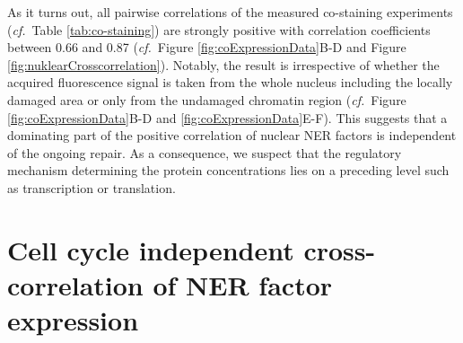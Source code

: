 \noindent As it turns out, all pairwise correlations of the measured co-staining experiments (\textit{cf.}\ Table \ref{tab:co-staining}) are strongly positive with correlation coefficients between 0.66 and 0.87 (\textit{cf.}\ Figure \ref{fig:coExpressionData}B-D and Figure \ref{fig:nuklearCrosscorrelation}). Notably, the result is irrespective of whether the acquired fluorescence signal is taken from the whole nucleus including the locally damaged area or only from the undamaged chromatin region (\textit{cf.}\ Figure \ref{fig:coExpressionData}B-D and \ref{fig:coExpressionData}E-F). This suggests that a dominating part of the positive correlation of nuclear NER factors is independent of the ongoing repair. As a consequence, we suspect that the regulatory mechanism determining the protein concentrations lies on a preceding level such as transcription or translation.\\  



\section {Cell cycle independent cross-correlation of NER factor expression}

